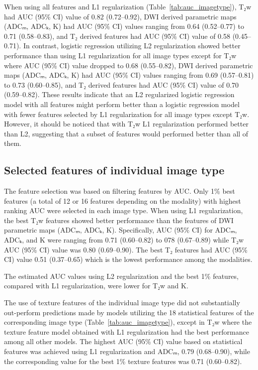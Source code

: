 When using all features and L1 regularization (Table~\ref{tab:auc_imagetype}),
T₂w had AUC (95\% CI) value of 0.82 (0.72--0.92), DWI derived parametric maps
(ADCₘ, ADCₖ, K) had AUC (95\% CI) values ranging from 0.64 (0.52--0.77) to
0.71 (0.58--0.83), and T₂ derived features had AUC (95\% CI) value of 0.58
(0.45--0.71). In contrast, logistic regression utilizing L2 regularization
showed better performance than using L1 regularization for all image types
except for T₂w where AUC (95\% CI) value dropped to 0.68 (0.55--0.82), DWI
derived parametric maps (ADCₘ, ADCₖ, K) had AUC (95\% CI) values ranging from
0.69 (0.57--0.81) to 0.73 (0.60--0.85), and T₂ derived features had AUC (95\%
CI) value of 0.70 (0.59--0.82). These results indicate that an L2 regularized
logistic regression model with all features might perform better than a logistic
regression model with fewer features selected by L1 regularization for all image
types except T₂w. However, it should be noticed that with T₂w L1
regularization performed better than L2, suggesting that a subset of features
would performed better than all of them.


\subsection{Selected features of individual image type}

The feature selection was based on filtering features by AUC\@. Only 1\% best
features (a total of 12 or 16 features depending on the modality) with highest
ranking AUC were selected in each image type. When using L1 regularization, the
best T₂w features showed better performance than the features of DWI
parametric maps (ADCₘ, ADCₖ, K). Specifically, AUC (95\% CI) for ADCₘ, ADCₖ,
and K were ranging from 0.71 (0.60--0.82) to 078 (0.67--0.89) while T₂w AUC
(95\% CI) value was 0.80 (0.69--0.90). The best T₂ features had AUC (95\% CI)
value 0.51 (0.37--0.65) which is the lowest performance among the modalities.

The estimated AUC values using L2 regularization and the best 1\% features,
compared with L1 regularization, were lower for T₂w and K.

The use of texture features of the individual image type did not substantially
out-perform predictions made by models utilizing the 18 statistical features of
the corresponding image type (Table~\ref{tab:auc_imagetype}), except in T₂w
where the texture feature model obtained with L1 regularization had the best
performance among all other models. The highest AUC (95\% CI) value based on
statistical features was achieved using L1 regularization and ADCₘ, 0.79
(0.68--0.90), while the corresponding value for the best 1\% texture features
was 0.71 (0.60--0.82).

